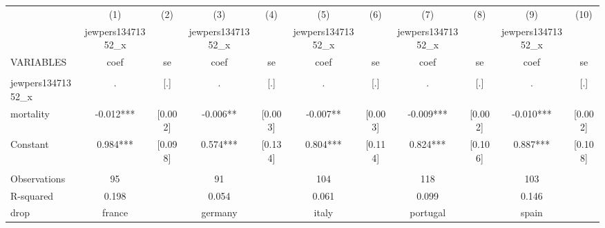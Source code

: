 \documentclass[landscape]{article}
\begin{document}
\begin{tabular}{lcccccccccc} \hline
 & (1) & (2) & (3) & (4) & (5) & (6) & (7) & (8) & (9) & (10) \\
 & jewpers13471352\_x &  & jewpers13471352\_x &  & jewpers13471352\_x &  & jewpers13471352\_x &  & jewpers13471352\_x &  \\
VARIABLES & coef & se & coef & se & coef & se & coef & se & coef & se \\ \hline
 &  &  &  &  &  &  &  &  &  &  \\
jewpers13471352\_x & . & [.] & . & [.] & . & [.] & . & [.] & . & [.] \\
mortality & -0.012*** & [0.002] & -0.006** & [0.003] & -0.007** & [0.003] & -0.009*** & [0.002] & -0.010*** & [0.002] \\
Constant & 0.984*** & [0.098] & 0.574*** & [0.134] & 0.804*** & [0.114] & 0.824*** & [0.106] & 0.887*** & [0.108] \\
 &  &  &  &  &  &  &  &  &  &  \\
Observations & 95 &  & 91 &  & 104 &  & 118 &  & 103 &  \\
R-squared & 0.198 &  & 0.054 &  & 0.061 &  & 0.099 &  & 0.146 &  \\
 drop & france &  & germany &  & italy &  & portugal &  & spain &  \\ \hline
\end{tabular}
\end{document}
